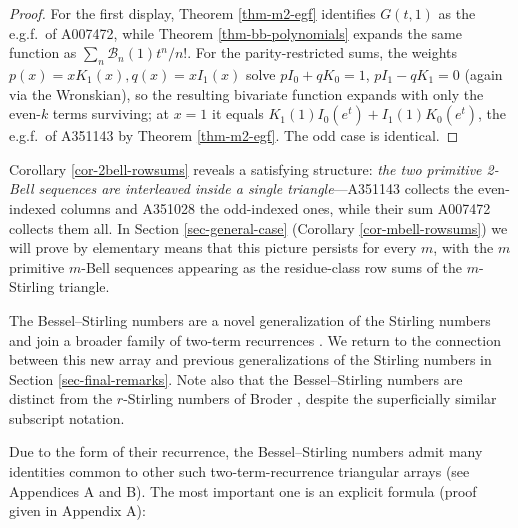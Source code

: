 \documentclass[a4paper]{amsart}
\numberwithin{equation}{section}
\begin{document}
\begin{proof}
For the first display, Theorem \ref{thm-m2-egf} identifies $G(t,1)$ as the e.g.f.\ of A007472, while Theorem \ref{thm-bb-polynomials} expands the same function as $\sum_n \mathscr{B}_n(1)t^n/n!$. For the parity-restricted sums, the weights $p(x) = xK_1(x), q(x) = xI_1(x)$ solve $pI_0 + qK_0 = 1$, $pI_1 - qK_1 = 0$ (again via the Wronskian), so the resulting bivariate function expands with only the even-$k$ terms surviving; at $x = 1$ it equals $K_1(1)I_0(e^t) + I_1(1)K_0(e^t)$, the e.g.f.\ of A351143 by Theorem \ref{thm-m2-egf}. The odd case is identical.
\end{proof}

Corollary \ref{cor-2bell-rowsums} reveals a satisfying structure: \emph{the two primitive 2-Bell sequences are interleaved inside a single triangle}---A351143 collects the even-indexed columns and A351028 the odd-indexed ones, while their sum A007472 collects them all. In Section \ref{sec-general-case} (Corollary \ref{cor-mbell-rowsums}) we will prove by elementary means that this picture persists for every $m$, with the $m$ primitive $m$-Bell sequences appearing as the residue-class row sums of the $m$-Stirling triangle.

The Bessel--Stirling numbers are a novel generalization of the Stirling numbers and join a broader family of two-term recurrences \cite{mansour_general_2012,neuwirth_recursively_2001,barbero_g_bivariate_2014,spiveySolutionsGeneralCombinatorial2011}. We return to the connection between this new array and previous generalizations of the Stirling numbers in Section \ref{sec-final-remarks}. Note also that the Bessel--Stirling numbers are distinct from the $r$-Stirling numbers of Broder \cite{broder1984}, despite the superficially similar subscript notation.

Due to the form of their recurrence, the Bessel--Stirling numbers admit many identities common to other such two-term-recurrence triangular arrays (see Appendices A and B). The most important one is an explicit formula (proof given in Appendix A):
\end{document}
